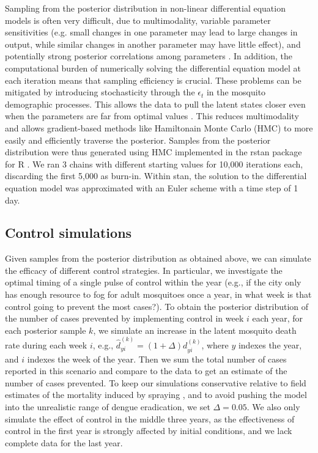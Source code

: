 \documentclass[10pt,letterpaper]{article}
\begin{document}
Sampling from the posterior distribution in non-linear differential equation models is often very difficult, due to multimodality, variable parameter sensitivities (e.g. small changes in one parameter may lead to large changes in output, while similar changes in another parameter may have little effect), and potentially strong posterior correlations among parameters \cite{Reilly2005, Girolami2008, Calderhead2011}.
In addition, the computational burden of numerically solving the differential equation model at each iteration means that sampling efficiency is crucial.
These problems can be mitigated by introducing stochasticity through the $\epsilon_t$ in the mosquito demographic processes.
This allows the data to pull the latent states closer even when the parameters are far from optimal values \cite{Leander2014}.
This reduces multimodality and allows gradient-based methods like Hamiltonain Monte Carlo (HMC) to more easily and efficiently traverse the posterior.
Samples from the posterior distribution were thus generated using HMC implemented in the rstan package \cite{Carpenter2016, Rstan2017} for R \cite{R2016}. 
We ran 3 chains with different starting values for 10,000 iterations each, discarding the first 5,000 as burn-in.
Within stan, the solution to the differential equation model was approximated with an Euler scheme with a time step of 1 day.  

\subsection*{Control simulations}

Given samples from the posterior distribution as obtained above, we can simulate the efficacy of different control strategies.
In particular, we investigate the optimal timing of a single pulse of control within the year (e.g., if the city only has enough resource to fog for adult mosquitoes once a year, in what week is that control going to prevent the most cases?).
To obtain the posterior distribution of the number of cases prevented by implementing control in week $i$ each year, for each posterior sample $k$, we simulate an increase in the latent mosquito death rate during each week $i$, e.g.,
$\hat{d}^{(k)}_{yi} = (1 + \Delta) d^{(k)}_{yi}$, where $y$ indexes the year, and $i$ indexes the week of the year.
Then we sum the total number of cases reported in this scenario and compare to the data to get an estimate of the number of cases prevented.
To keep our simulations conservative relative to field estimates of the mortality induced by spraying \cite{Esu2010}, and to avoid pushing the model into the unrealistic range of dengue eradication, we set $\Delta = 0.05$.
We also only simulate the effect of control in the middle three years, as the effectiveness of control in the first year is strongly affected by initial conditions, and we lack complete data for the last year.
\end{document}
